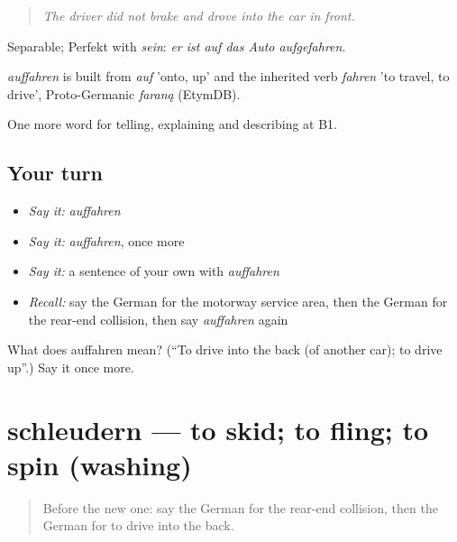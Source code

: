 \begin{quote}
\emph{The driver did not brake and drove into the car in front.}
\end{quote}

Separable; Perfekt with \emph{sein}: \emph{er ist auf das Auto aufgefahren}.

\begin{cousinweb}
\emph{auffahren} is built from \emph{auf} 'onto, up' and the inherited verb \emph{fahren} 'to travel, to drive', Proto-Germanic \emph{faraną} (EtymDB).
\end{cousinweb}

\begin{grammarlens}[title={What you've built}]
One more word for telling, explaining and describing at B1.
\end{grammarlens}

\subsection*{Your turn}
\begin{itemize}
\raggedright
  \item \emph{Say it:} \emph{auffahren}
  \item \emph{Say it:} \emph{auffahren}, once more
  \item \emph{Say it:} a sentence of your own with \emph{auffahren}
  \item \emph{Recall:} say the German for the motorway service area, then the German for the rear-end collision, then say \emph{auffahren} again
\end{itemize}

\begin{tcolorbox}[breakable,colback=teal!4,colframe=teal!35!black,title={Before you move on}]
What does auffahren mean? (\textquotedblleft{}To drive into the back (of another car); to drive up\textquotedblright{}.) Say it once more.
\end{tcolorbox}
\section[schleudern]{schleudern — to skid; to fling; to spin (washing)}

\label{lesson:GE-C410-schleudern}



\begin{quote}
Before the new one: say the German for the rear-end collision, then the German for to drive into the back.
\end{quote}

